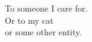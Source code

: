 \begin{flushright}
    \thispagestyle{empty}
    \vspace*{\fill}
    \epigraph{To someone I care for.\\
    	Or to my cat\\
    	or some other entity.}{}
    \vspace*{\fill}
\end{flushright}
\clearpage